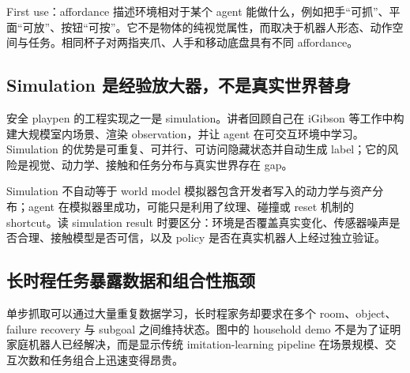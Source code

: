 
\begin{knowledgebox}{First use：affordance}
描述环境相对于某个 agent 能做什么，例如把手“可抓”、平面“可放”、按钮“可按”。它不是物体的纯视觉属性，而取决于机器人形态、动作空间与任务。相同杯子对两指夹爪、人手和移动底盘具有不同 affordance。
\end{knowledgebox}

\subsection{Simulation 是经验放大器，不是真实世界替身}

安全 playpen 的工程实现之一是 simulation。讲者回顾自己在 iGibson 等工作中构建大规模室内场景、渲染 observation，并让 agent 在可交互环境中学习。Simulation 的优势是可重复、可并行、可访问隐藏状态并自动生成 label；它的风险是视觉、动力学、接触和任务分布与真实世界存在 gap。



\begin{warningbox}{Simulation 不自动等于 world model}
模拟器包含开发者写入的动力学与资产分布；agent 在模拟器里成功，可能只是利用了纹理、碰撞或 reset 机制的 shortcut。读 simulation result 时要区分：环境是否覆盖真实变化、传感器噪声是否合理、接触模型是否可信，以及 policy 是否在真实机器人上经过独立验证。
\end{warningbox}

\subsection{长时程任务暴露数据和组合性瓶颈}

单步抓取可以通过大量重复数据学习，长时程家务却要求在多个 room、object、failure recovery 与 subgoal 之间维持状态。图中的 household demo 不是为了证明家庭机器人已经解决，而是显示传统 imitation-learning pipeline 在场景规模、交互次数和任务组合上迅速变得昂贵。


